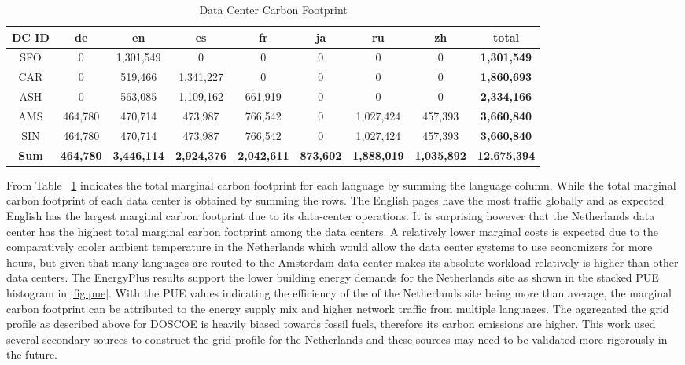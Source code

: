 \documentclass[twocolumn, a4paper,10pt]{article}
\begin{document}
\begin{table}[ht]
  \vspace{-10 pt}
  \caption{Data Center Carbon Footprint}
  \label{table:tab03}
  \begin{small}
  \centering
  \begin{tabular}{|c c c c c c c c c| }
    \hline
    \bf{DC ID} & \bf{de} & \bf{en}    & \bf{es} & \bf{fr} & \bf{ja} & \bf{ru} & \bf{zh} & \bf{total}\\
    \hline
    SFO        & 0       & 1,301,549  & 0       & 0 & 0 & 0 & 0 & \bf{1,301,549}\\
    CAR        & 0       & 519,466    & 1,341,227  & 0 & 0 & 0 & 0 & \bf{1,860,693}\\
    ASH        & 0       & 563,085    & 1,109,162  & 661,919 & 0 & 0 & 0 & \bf{2,334,166}\\
    AMS       & 464,780      & 470,714   & 473,987  & 766,542 & 0 & 1,027,424 & 457,393 & \bf{3,660,840}\\
    SIN &  464,780      & 470,714   & 473,987  & 766,542 & 0 & 1,027,424 & 457,393 & \bf{3,660,840}\\
    \hline
    \bf{Sum} & \bf{464,780} & \bf{3,446,114}    & \bf{2,924,376} & \bf{2,042,611} & \bf{873,602} & \bf{1,888,019} & \bf{1,035,892} & \bf{12,675,394}\\
    \hline
  \end{tabular}
  \end{small}
  \vspace{-10 pt}   %
  \end{table}

From Table~ \ref{table:tab03} indicates the total marginal carbon footprint for each language by summing the language column. While the total marginal carbon footprint of each data center is obtained by summing the rows. The English pages have the most traffic globally and as expected English has the largest marginal carbon footprint due to its data-center operations. It is surprising however that the Netherlands data center has the highest total marginal carbon footprint among the data centers. A relatively lower marginal costs is expected due to the comparatively cooler ambient temperature in the Netherlands which would allow the data center systems to use economizers for more hours, but given that many languages are routed to the Amsterdam data center makes its absolute workload relatively is higher than other data centers. The EnergyPlus results support the lower building energy demands for the Netherlands site as shown in the stacked PUE histogram in \ref{fig:pue}. With the PUE values indicating the efficiency of the of the Netherlands site being more than average, the marginal carbon footprint can be attributed to the energy supply mix and higher network traffic from multiple languages. The aggregated the grid profile as described above for DOSCOE is heavily biased towards fossil fuels, therefore its carbon emissions are higher. This work used several secondary sources to construct the grid profile for the Netherlands and these sources may need to be validated more rigorously in the future.
\end{document}
